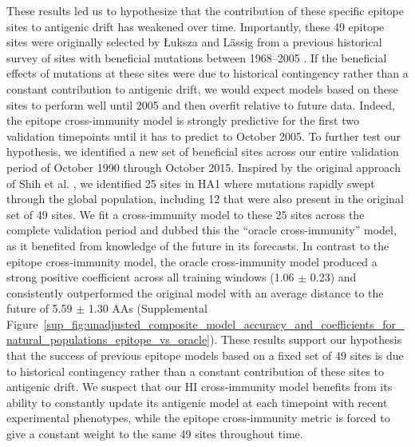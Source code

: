 These results led us to hypothesize that the contribution of these specific epitope sites to antigenic drift has weakened over time.
Importantly, these 49 epitope sites were originally selected by {\L}uksza and L\"assig \cite{Luksza:2014hj} from a previous historical survey of sites with beneficial mutations between 1968--2005 \cite{Shih:2007bd}.
If the beneficial effects of mutations at these sites were due to historical contingency rather than a constant contribution to antigenic drift, we would expect models based on these sites to perform well until 2005 and then overfit relative to future data.
Indeed, the epitope cross-immunity model is strongly predictive for the first two validation timepoints until it has to predict to October 2005.
To further test our hypothesis, we identified a new set of beneficial sites across our entire validation period of October 1990 through October 2015.
Inspired by the original approach of Shih et al. \cite{Shih:2007bd}, we identified 25 sites in HA1 where mutations rapidly swept through the global population, including 12 that were also present in the original set of 49 sites.
We fit a cross-immunity model to these 25 sites across the complete validation period and dubbed this the ``oracle cross-immunity'' model, as it benefited from knowledge of the future in its forecasts.
In contrast to the epitope cross-immunity model, the oracle cross-immunity model produced a strong positive coefficient across all training windows (1.06 $\pm$ 0.23) and consistently outperformed the original model with an average distance to the future of 5.59 $\pm$ 1.30 AAs (Supplemental Figure~\ref{sup_fig:unadjusted_composite_model_accuracy_and_coefficients_for_natural_populations_epitope_vs_oracle}).
These results support our hypothesis that the success of previous epitope models based on a fixed set of 49 sites is due to historical contingency rather than a constant contribution of these sites to antigenic drift.
We suspect that our HI cross-immunity model benefits from its ability to constantly update its antigenic model at each timepoint with recent experimental phenotypes, while the epitope cross-immunity metric is forced to give a constant weight to the same 49 sites throughout time.

